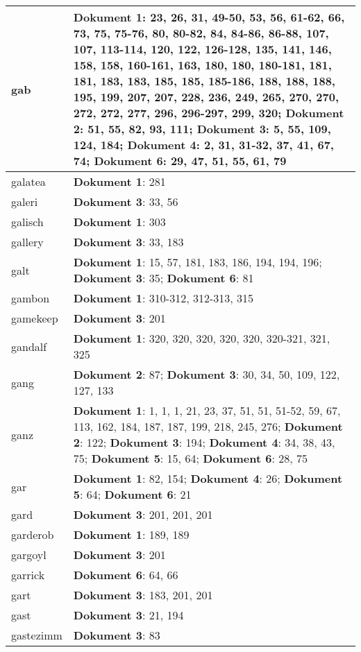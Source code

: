 \documentclass[a5paper]{article}
\begin{document}
\begin{longtable}[l]{|l|p{3in}|}
\hline
gab & \textbf{Dokument 1}: 23, 26, 31, 49-50, 53, 56, 61-62, 66, 73, 75, 75-76, 80, 80-82, 84, 84-86, 86-88, 107, 107, 113-114, 120, 122, 126-128, 135, 141, 146, 158, 158, 160-161, 163, 180, 180, 180-181, 181, 181, 183, 183, 185, 185, 185-186, 188, 188, 188, 195, 199, 207, 207, 228, 236, 249, 265, 270, 270, 272, 272, 277, 296, 296-297, 299, 320; \textbf{Dokument 2}: 51, 55, 82, 93, 111; \textbf{Dokument 3}: 5, 55, 109, 124, 184; \textbf{Dokument 4}: 2, 31, 31-32, 37, 41, 67, 74; \textbf{Dokument 6}: 29, 47, 51, 55, 61, 79 \\
\hline
galatea & \textbf{Dokument 1}: 281 \\
\hline
galeri & \textbf{Dokument 3}: 33, 56 \\
\hline
galisch & \textbf{Dokument 1}: 303 \\
\hline
gallery & \textbf{Dokument 3}: 33, 183 \\
\hline
galt & \textbf{Dokument 1}: 15, 57, 181, 183, 186, 194, 194, 196; \textbf{Dokument 3}: 35; \textbf{Dokument 6}: 81 \\
\hline
gambon & \textbf{Dokument 1}: 310-312, 312-313, 315 \\
\hline
gamekeep & \textbf{Dokument 3}: 201 \\
\hline
gandalf & \textbf{Dokument 1}: 320, 320, 320, 320, 320, 320-321, 321, 325 \\
\hline
gang & \textbf{Dokument 2}: 87; \textbf{Dokument 3}: 30, 34, 50, 109, 122, 127, 133 \\
\hline
ganz & \textbf{Dokument 1}: 1, 1, 1, 21, 23, 37, 51, 51, 51-52, 59, 67, 113, 162, 184, 187, 187, 199, 218, 245, 276; \textbf{Dokument 2}: 122; \textbf{Dokument 3}: 194; \textbf{Dokument 4}: 34, 38, 43, 75; \textbf{Dokument 5}: 15, 64; \textbf{Dokument 6}: 28, 75 \\
\hline
gar & \textbf{Dokument 1}: 82, 154; \textbf{Dokument 4}: 26; \textbf{Dokument 5}: 64; \textbf{Dokument 6}: 21 \\
\hline
gard & \textbf{Dokument 3}: 201, 201, 201 \\
\hline
garderob & \textbf{Dokument 1}: 189, 189 \\
\hline
gargoyl & \textbf{Dokument 3}: 201 \\
\hline
garrick & \textbf{Dokument 6}: 64, 66 \\
\hline
gart & \textbf{Dokument 3}: 183, 201, 201 \\
\hline
gast & \textbf{Dokument 3}: 21, 194 \\
\hline
gastezimm & \textbf{Dokument 3}: 83 \\

\end{longtable}
\end{document}
